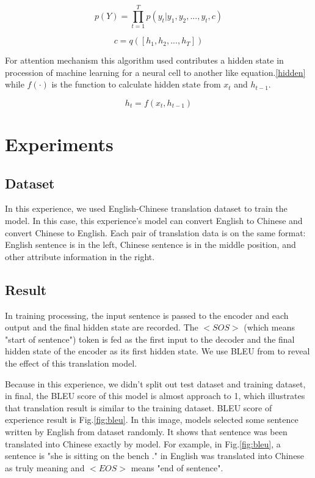 \documentclass[journal, a4paper]{IEEEtran}
\begin{document}
\begin{equation}
    p(Y)= \prod_{t=1}^{T} \label{probability}p(y_t|y_1,y_2,...,y_{t},c)
\end{equation}

\begin{equation}
    c=q([h_1,h_2,...,h_T]) \label{sv}
\end{equation}

For attention mechanism this algorithm used contributes a hidden state in procession of machine learning for a neural cell to another like equation.\ref{hidden} while $ f(\cdot) $ is the function to calculate hidden state from $ x_t $ and $ h_{t-1} $.

\begin{equation}
    h_t=f(x_t,h_{t-1}) \label{hidden}
\end{equation}




\section{Experiments}
\subsection{Dataset}
In this experience, we used English-Chinese translation dataset to train the model. In this case, this experience's model can convert English to Chinese and convert Chinese to English. Each pair of translation data is on the same format: English sentence is in the left, Chinese sentence is in the middle position, and other attribute information in the right.

\subsection{Result}

In training processing, the input sentence is passed to the encoder and each output and the final hidden state are recorded. The $ <SOS> $ (which means "start of sentence") token is fed as the first input to the decoder and the final hidden state of the encoder as its first hidden state.
We use BLEU from \cite{papineni-etal-2002-bleu} to reveal the effect of this translation model.

Because in this experience, we didn't split out test dataset and training dataset, in final, the BLEU score of this model is almost approach to 1, which illustrates that translation result is similar to the training dataset. BLEU score of experience result is Fig.\ref{fig:bleu}. In this image, models selected some sentence written by English from dataset randomly. It shows that sentence was been translated into Chinese exactly by model. For example, in Fig.\ref{fig:bleu}, a sentence is "she is sitting on the bench ." in English was translated into Chinese as truly meaning and $ <EOS> $ means "end of sentence".
\end{document}
